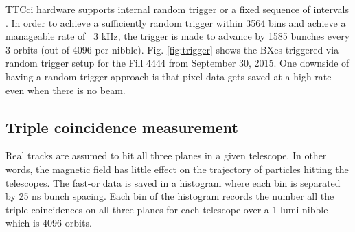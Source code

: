TTCci hardware supports internal random trigger or a fixed sequence of intervals \cite{TTCI} . In order to achieve a sufficiently random trigger within 3564 bins and achieve a manageable rate of ~3 kHz, the trigger is made to advance by 1585 bunches every 3 orbits (out of 4096 per nibble). Fig. \ref{fig:trigger} shows the BXes triggered via random trigger setup for the Fill 4444 from September 30, 2015. One downside of having a random trigger approach is that pixel data gets saved at a high rate even when there is no beam.










\subsection{Triple coincidence measurement}
Real tracks are assumed to hit all three planes in a given telescope. In other words, the magnetic field has little effect on the trajectory of particles hitting the telescopes. The fast-or data is saved in a histogram where each bin is separated by 25 ns bunch spacing. Each bin of the histogram records the number all the triple coincidences on all three planes for each telescope over a 1 lumi-nibble which is 4096 orbits.

